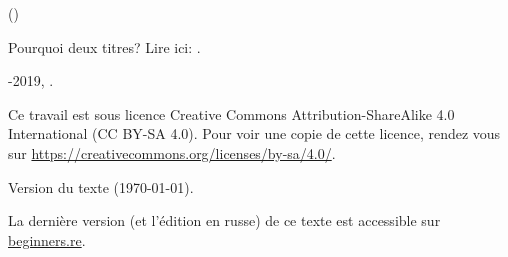 ﻿\begin{titlepage}


\end{titlepage}

\newpage

\begin{center}
\vspace*{\fill}
{\LARGE \TitleMain}

\bigskip

{\large (\TitleAux)}

\bigskip
\bigskip
Pourquoi deux titres? Lire ici: .

\vspace*{\fill}

{\large \AUTHOR}

{\large \TT{<\EMAIL>}}
\vspace*{\fill}
\vfill

\ccbysa

-2019, \AUTHOR.

Ce travail est sous licence Creative Commons Attribution-ShareAlike 4.0 International (CC BY-SA 4.0).
Pour voir une copie de cette licence, rendez vous sur \url{https://creativecommons.org/licenses/by-sa/4.0/}.

Version du texte ({\large \today}).

La dernière version (et l'édition en russe) de ce texte est accessible sur \href{http://go.yurichev.com/17009}{beginners.re}.

\end{center}

